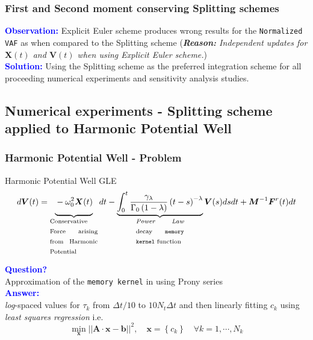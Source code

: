 \documentclass[a4paper,10pt]{beamer}
\newcommand{\BS}[1]{\boldsymbol{#1}}
\newcommand{\rb}[1]{\left( #1 \right)}
\newcommand{\norm}[1]{\left| \left| #1 \right| \right|}
\begin{document}
	\begin{frame}
		\frametitle{\large First and Second moment conserving Splitting schemes}
		\large
		\textcolor{blue}{\textbf{Observation:}}
		{Explicit Euler scheme produces wrong results for the \texttt{Normalized VAF} as when compared to the Splitting scheme} (\textit{\textbf{Reason:} Independent updates for $\BS{X}(t)$ and $\BS{V}(t)$ when using Explicit Euler scheme.}) \\
		\vspace{0.25cm}
		\textcolor{blue}{\textbf{Solution:}}
		{Using the Splitting scheme as the preferred integration scheme for all proceeding numerical experiments and sensitivity analysis studies.}
	\end{frame}
	
	\begin{frame}
		\subsection{Numerical experiments - Splitting scheme applied to Harmonic Potential Well}
		\frametitle{Harmonic Potential Well - Problem}
		\begin{block}{Harmonic Potential Well GLE}
			\footnotesize
			\begin{align}
				d\BS{V}(t) = \underbrace{\vphantom{\int_{0}^{t} \frac{\gamma_{\lambda}}{\Gamma_{0} \rb{1-\lambda}}\rb{t-s}^{-\lambda} \BS{V}(s) ds dt} -\omega^{2}_{0} \BS{X}(t)}_{\text{\begin{minipage}{0.165\linewidth}
						Conservative Force arising from Harmonic Potential
						\end{minipage}}}dt - \underbrace{\int_{0}^{t} \frac{\gamma_{\lambda}}{\Gamma_{0} \rb{1-\lambda}}\rb{t-s}^{-\lambda}}_{\text{\begin{minipage}{0.165\linewidth}
						\textit{Power Law} decay \texttt{memory kernel} function
						\end{minipage}}} \BS{V}(s) ds dt + \BS{M}^{-1} \BS{F}^{r}(t) dt
						\label{eq:HarmonicGLE}
			\end{align}
		\end{block}
		\textcolor{blue}{\textbf{Question?}} \\ Approximation of the \texttt{memory kernel} in  using Prony series \\
		\textcolor{blue}{\textbf{Answer:}} \\
		\textit{log}-spaced values for $\tau_{k}$ from $\Delta t/10$ to $10N_{t}\Delta t$ and then linearly fitting $c_{k}$ using \textit{least squares regression} i.e. $$\min_{\BS{x}} \norm{\BS{A}\cdot \BS{x}-\BS{b}}^{2}, \quad \BS{x} = \left\{ c_{k} \right\} \quad \forall
		 k=1, \cdots, N_{k}$$
	\end{frame}
\end{document}
